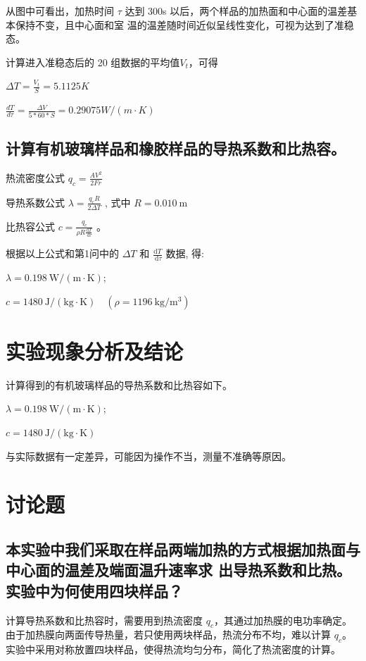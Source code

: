 \documentclass[signature=data]{physicsreport}
\begin{document}
从图中可看出，加热时间 $τ$ 达到 300s 以后，两个样品的加热面和中心面的温差基本保持不变，且中心面和室
温的温差随时间近似呈线性变化，可视为达到了准稳态。

计算进入准稳态后的 20 组数据的平均值$V_t$，可得

$\Delta T=\frac{V_t}{S}=5.1125K$

$\frac{dT}{d\tau}=\frac{\Delta V}{5*60*S}= 0.29075W/(m \cdot K)$

\subsection{计算有机玻璃样品和橡胶样品的导热系数和比热容。}

热流密度公式  $q_{c}=\frac{A V^{2}}{2 F r}$

导热系数公式  $\lambda=\frac{q_{c} R}{2 \Delta T}$ , 式中  $R=0.010 \mathrm{~m}  $

比热容公式  $c=\frac{q_{c}}{\rho R \frac{\mathrm{d} T}{\mathrm{~d} \tau}} $ 。

根据以上公式和第1问中的  $\Delta T$  和  $\frac{\mathrm{d} T}{\mathrm{~d} \tau}$  数据, 得: 

$ \lambda=0.198 \mathrm{~W} /(\mathrm{m} \cdot \mathrm{K}) $; 

$c=1480 \mathrm{~J} /(\mathrm{kg} \cdot \mathrm{K}) \quad\left(\rho=1196 \mathrm{~kg} / \mathrm{m}^{3}\right) $




\newpage

\section{实验现象分析及结论}

计算得到的有机玻璃样品的导热系数和比热容如下。

$ \lambda=0.198 \mathrm{~W} /(\mathrm{m} \cdot \mathrm{K}) $; 

$c=1480 \mathrm{~J} /(\mathrm{kg} \cdot \mathrm{K}) $

与实际数据有一定差异，可能因为操作不当，测量不准确等原因。

\section{讨论题}



\subsection{本实验中我们采取在样品两端加热的方式根据加热面与中心面的温差及端面温升速率求
出导热系数和比热。实验中为何使用四块样品？}
计算导热系数和比热容时，需要用到热流密度 $q_c$，其通过加热膜的电功率确定。由于加热膜向两面传导热量，若只使用两块样品，热流分布不均，难以计算 $q_c$。实验中采用对称放置四块样品，使得热流均匀分布，简化了热流密度的计算。
\end{document}
